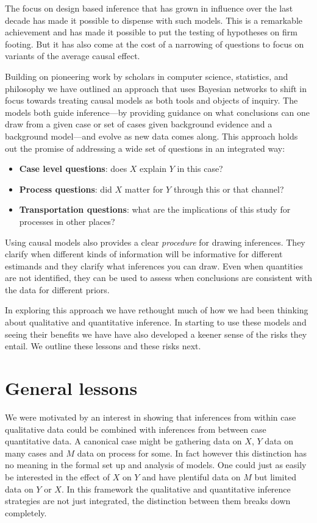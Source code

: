 \documentclass[12pt,]{book}
\providecommand{\tightlist}{%
  \setlength{\itemsep}{0pt}\setlength{\parskip}{0pt}}
\begin{document}
The focus on design based inference that has grown in influence over the last decade has made it possible to dispense with such models. This is a remarkable achievement and has made it possible to put the testing of hypotheses on firm footing. But it has also come at the cost of a narrowing of questions to focus on variants of the average causal effect.

Building on pioneering work by scholars in computer science, statistics, and philosophy we have outlined an approach that uses Bayesian networks to shift in focus towards treating causal models as both tools and objects of inquiry. The models both guide inference---by providing guidance on what conclusions can one draw from a given case or set of cases given background evidence and a background model---and evolve as new data comes along. This approach holds out the promise of addressing a wide set of questions in an integrated way:

\begin{itemize}
\tightlist
\item
  \textbf{Case level questions}: does \(X\) explain \(Y\) in this case?
\item
  \textbf{Process questions}: did \(X\) matter for \(Y\) through this or that channel?
\item
  \textbf{Transportation questions}: what are the implications of this study for processes in other places?
\end{itemize}

Using causal models also provides a clear \emph{procedure} for drawing inferences. They clarify when different kinds of information will be informative for different estimands and they clarify what inferences you can draw. Even when quantities are not identified, they can be used to assess when conclusions are consistent with the data for different priors.

In exploring this approach we have rethought much of how we had been thinking about qualitative and quantitative inference. In starting to use these models and seeing their benefits we have have also developed a keener sense of the risks they entail. We outline these lessons and these risks next.

\hypertarget{general-lessons}{%
\section{General lessons}\label{general-lessons}}

We were motivated by an interest in showing that inferences from within case qualitative data could be combined with inferences from between case quantitative data. A canonical case might be gathering data on \(X\), \(Y\) data on many cases and \(M\) data on process for some. In fact however this distinction has no meaning in the formal set up and analysis of models. One could just as easily be interested in the effect of \(X\) on \(Y\) and have plentiful data on \(M\) but limited data on \(Y\) or \(X\). In this framework the qualitative and quantitative inference strategies are not just integrated, the distinction between them breaks down completely.
\end{document}
